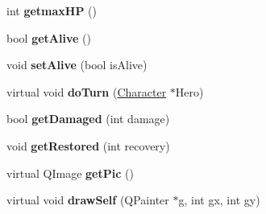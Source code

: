 \begin{DoxyCompactItemize}
\item 
\hypertarget{class_enemy_a32c6b8b1784ff8301c1cb20d969bb6bb}{int {\bfseries getmax\-H\-P} ()}\label{class_enemy_a32c6b8b1784ff8301c1cb20d969bb6bb}

\item 
\hypertarget{class_enemy_a4c6c4bfd244315ba6cfd338428f33d48}{bool {\bfseries get\-Alive} ()}\label{class_enemy_a4c6c4bfd244315ba6cfd338428f33d48}

\item 
\hypertarget{class_enemy_aa9ed76dea0526fba28e15e9667a9eb25}{void {\bfseries set\-Alive} (bool is\-Alive)}\label{class_enemy_aa9ed76dea0526fba28e15e9667a9eb25}

\item 
\hypertarget{class_enemy_a56e4b9b07e8cd2a4e5ecfa8ff5b9265a}{virtual void {\bfseries do\-Turn} (\hyperlink{class_character}{Character} $\ast$Hero)}\label{class_enemy_a56e4b9b07e8cd2a4e5ecfa8ff5b9265a}

\item 
\hypertarget{class_enemy_a577a10f1cd0eb2bdd7f600c63044b010}{bool {\bfseries get\-Damaged} (int damage)}\label{class_enemy_a577a10f1cd0eb2bdd7f600c63044b010}

\item 
\hypertarget{class_enemy_a17b20f01b5af2ca88c844fb0f072f4fc}{void {\bfseries get\-Restored} (int recovery)}\label{class_enemy_a17b20f01b5af2ca88c844fb0f072f4fc}

\item 
\hypertarget{class_enemy_a7eb85dffc1f22c21eb6ff805192f3818}{virtual Q\-Image {\bfseries get\-Pic} ()}\label{class_enemy_a7eb85dffc1f22c21eb6ff805192f3818}

\item 
\hypertarget{class_enemy_a3251244e8e7ac657687d6be5a8da71bb}{virtual void {\bfseries draw\-Self} (Q\-Painter $\ast$g, int gx, int gy)}\label{class_enemy_a3251244e8e7ac657687d6be5a8da71bb}

\end{DoxyCompactItemize}
